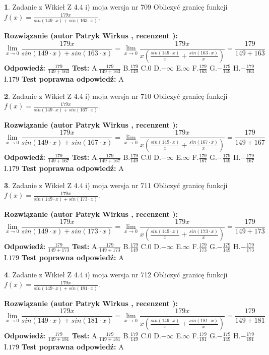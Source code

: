 \documentclass[12pt, a4paper]{article}
\theoremstyle{definition} %
\newtheorem{zad}{}
\newcommand{\zadStart}[1]{\begin{zad}#1\newline}
\newcommand{\zadStop}{\end{zad}}
\newcommand{\rozwStart}[2]{\noindent \textbf{Rozwiązanie (autor #1 , recenzent #2): }\newline}
\newcommand{\rozwStop}{\newline}
\newcommand{\odpStart}{\noindent \textbf{Odpowiedź:}\newline}
\newcommand{\odpStop}{\newline}
\newcommand{\testStart}{\noindent \textbf{Test:}\newline}
\newcommand{\testStop}{\newline}
\newcommand{\kluczStart}{\noindent \textbf{Test poprawna odpowiedź:}\newline}
\newcommand{\kluczStop}{\newline}
\begin{document}
\zadStart{Zadanie z Wikieł Z 4.4 i) moja wersja nr 709}
Obliczyć granicę funkcji $f(x)=\frac{179x}{sin(149\cdot x) +sin(163\cdot x)}$.
\zadStop
\rozwStart{Patryk Wirkus}{}
$$\lim\limits_{x\to 0}\frac{179x}{sin(149\cdot x) +sin(163\cdot x)}=\lim\limits_{x\to 0}\frac{179x}{x(\frac{sin(149\cdot x)}{x}+\frac{sin(163\cdot x)}{x})}=\frac{179}{149+163}$$
\rozwStop
\odpStart
$\frac{179}{149+163}$
\odpStop
\testStart
A.$\frac{179}{149+163}$
B.$\frac{179}{149}$
C.$0$
D.$-\infty$
E.$\infty$
F.$\frac{179}{163}$
G.$-\frac{179}{149}$
H.$-\frac{179}{163}$
I.$179$
\testStop
\kluczStart
A
\kluczStop



\zadStart{Zadanie z Wikieł Z 4.4 i) moja wersja nr 710}
Obliczyć granicę funkcji $f(x)=\frac{179x}{sin(149\cdot x) +sin(167\cdot x)}$.
\zadStop
\rozwStart{Patryk Wirkus}{}
$$\lim\limits_{x\to 0}\frac{179x}{sin(149\cdot x) +sin(167\cdot x)}=\lim\limits_{x\to 0}\frac{179x}{x(\frac{sin(149\cdot x)}{x}+\frac{sin(167\cdot x)}{x})}=\frac{179}{149+167}$$
\rozwStop
\odpStart
$\frac{179}{149+167}$
\odpStop
\testStart
A.$\frac{179}{149+167}$
B.$\frac{179}{149}$
C.$0$
D.$-\infty$
E.$\infty$
F.$\frac{179}{167}$
G.$-\frac{179}{149}$
H.$-\frac{179}{167}$
I.$179$
\testStop
\kluczStart
A
\kluczStop



\zadStart{Zadanie z Wikieł Z 4.4 i) moja wersja nr 711}
Obliczyć granicę funkcji $f(x)=\frac{179x}{sin(149\cdot x) +sin(173\cdot x)}$.
\zadStop
\rozwStart{Patryk Wirkus}{}
$$\lim\limits_{x\to 0}\frac{179x}{sin(149\cdot x) +sin(173\cdot x)}=\lim\limits_{x\to 0}\frac{179x}{x(\frac{sin(149\cdot x)}{x}+\frac{sin(173\cdot x)}{x})}=\frac{179}{149+173}$$
\rozwStop
\odpStart
$\frac{179}{149+173}$
\odpStop
\testStart
A.$\frac{179}{149+173}$
B.$\frac{179}{149}$
C.$0$
D.$-\infty$
E.$\infty$
F.$\frac{179}{173}$
G.$-\frac{179}{149}$
H.$-\frac{179}{173}$
I.$179$
\testStop
\kluczStart
A
\kluczStop



\zadStart{Zadanie z Wikieł Z 4.4 i) moja wersja nr 712}
Obliczyć granicę funkcji $f(x)=\frac{179x}{sin(149\cdot x) +sin(181\cdot x)}$.
\zadStop
\rozwStart{Patryk Wirkus}{}
$$\lim\limits_{x\to 0}\frac{179x}{sin(149\cdot x) +sin(181\cdot x)}=\lim\limits_{x\to 0}\frac{179x}{x(\frac{sin(149\cdot x)}{x}+\frac{sin(181\cdot x)}{x})}=\frac{179}{149+181}$$
\rozwStop
\odpStart
$\frac{179}{149+181}$
\odpStop
\testStart
A.$\frac{179}{149+181}$
B.$\frac{179}{149}$
C.$0$
D.$-\infty$
E.$\infty$
F.$\frac{179}{181}$
G.$-\frac{179}{149}$
H.$-\frac{179}{181}$
I.$179$
\testStop
\kluczStart
A
\kluczStop
\end{document}
